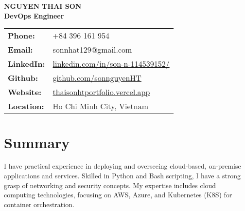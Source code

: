 \documentclass[a4paper,10pt]{article}
\begin{document}
\begin{center}
    {\Huge \textbf{NGUYEN THAI SON}} \\
    \vspace{6pt}
    \textbf{DevOps Engineer} \\
    \vspace{6pt}
    \begin{tabular}{ll}
        \textbf{Phone:} & +84 396 161 954 \\
        \textbf{Email:} & sonnhat129@gmail.com \\
        \textbf{LinkedIn:} & \href{https://www.linkedin.com/in/son-n-114539152/}{linkedin.com/in/son-n-114539152/} \\
        \textbf{Github:} & \href{https://github.com/sonnguyenHT}{github.com/sonnguyenHT} \\
        \textbf{Website:} & \href{https://thaisonhtportfolio.vercel.app/}{thaisonhtportfolio.vercel.app} \\
        \textbf{Location:} & Ho Chi Minh City, Vietnam \\
    \end{tabular}
\end{center}

\vspace{10pt}
\section*{Summary}
I have practical experience in deploying and overseeing cloud-based, on-premise applications and services. Skilled in Python and Bash scripting, I have a strong grasp of networking and security concepts. My expertise includes cloud computing technologies, focusing on AWS, Azure, and Kubernetes (K8S) for container orchestration.

\vspace{5pt}
\end{document}
